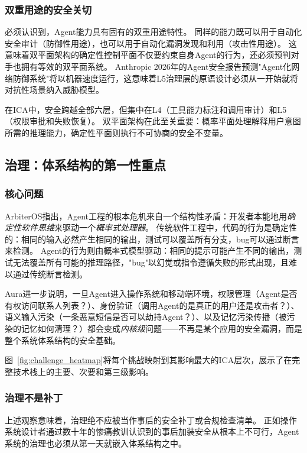 \subsubsection{双重用途的安全关切}
必须认识到，Agent能力具有固有的双重用途特性。
同样的能力既可以用于自动化安全审计（防御性用途），也可以用于自动化漏洞发现和利用（攻击性用途）\cite{anthropic2026agenticreport}。
这意味着双平面架构的确定性控制平面不仅要约束自身Agent的行为，还必须预判对手也拥有等效的双平面系统。
Anthropic 2026年的Agent安全报告预测"Agent化网络防御系统"将以机器速度运行\cite{anthropic2026agenticreport}，这意味着L5治理层的原语设计必须从一开始就将对抗性场景纳入威胁模型。

在ICA中，安全跨越全部六层，但集中在L4（工具能力标注和调用审计）和L5（权限审批和失败恢复）。
双平面架构在此至关重要：概率平面处理解释用户意图所需的推理能力，确定性平面则执行不可协商的安全不变量。


\subsection{治理：体系结构的第一性重点}

\subsubsection{核心问题}
ArbiterOS\cite{arbiteros2025}指出，Agent工程的根本危机来自一个结构性矛盾：开发者本能地用\emph{确定性软件思维}来驱动一个\emph{概率式处理器}。
传统软件工程中，代码的行为是确定性的：相同的输入必然产生相同的输出，测试可以覆盖所有分支，bug可以通过断言来检测。
Agent的行为则由概率式模型驱动：相同的提示可能产生不同的输出，测试无法覆盖所有可能的推理路径，"bug"以幻觉或指令遵循失败的形式出现，且难以通过传统断言检测。

Aura\cite{aura2025}进一步说明，一旦Agent进入操作系统和移动端环境，权限管理（Agent是否有权访问联系人列表？）、身份验证（调用Agent的是真正的用户还是攻击者？）、语义输入污染（一条恶意短信是否可以劫持Agent？）、以及记忆污染传播（被污染的记忆如何清理？）都会变成\emph{内核级}问题——不再是某个应用的安全漏洞，而是整个系统体系结构的安全基础。

图~\ref{fig:challenge_heatmap}将每个挑战映射到其影响最大的ICA层次，展示了在完整技术栈上的主要、次要和第三级影响。


\subsubsection{治理不是补丁}
上述观察意味着，治理绝不应被当作事后的安全补丁或合规检查清单。
正如操作系统设计者通过数十年的惨痛教训认识到的事后加装安全从根本上不可行\cite{ostep_2023}，Agent系统的治理也必须从第一天就嵌入体系结构之中。

